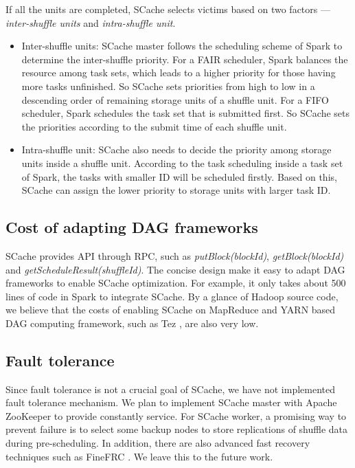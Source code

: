 If all the units are completed, SCache selects victims based on two factors --- \textit{inter-shuffle units} and \textit{intra-shuffle unit}.
\begin{itemize}[noitemsep]
	\item Inter-shuffle units: SCache master follows the scheduling scheme of Spark to determine the inter-shuffle priority. For a FAIR scheduler, Spark balances the resource among task sets, which leads to a higher priority for those having more tasks unfinished. So SCache sets priorities from high to low in a descending order of remaining storage units of a shuffle unit. For a FIFO scheduler, Spark schedules the task set that is submitted first. So SCache sets the priorities according to the submit time of each shuffle unit.
	\item Intra-shuffle unit: SCache also needs to decide the priority among storage units inside a shuffle unit. According to the task scheduling inside a task set of Spark, the tasks with smaller ID will be scheduled firstly. Based on this, SCache can assign the lower priority to storage units with larger task ID.
\end{itemize}

\subsection{Cost of adapting DAG frameworks}
SCache provides API through RPC, such as \textit{putBlock(blockId)}, \textit{getBlock(blockId)} and \textit{getScheduleResult(shuffleId)}. The concise design make it easy to adapt DAG frameworks to enable SCache optimization. For example, it only takes about 500 lines of code in Spark to integrate SCache. By a glance of Hadoop source code, we believe that the costs of enabling SCache on MapReduce \cite{hadoop} and YARN \cite{yarn} based DAG computing framework, such as Tez \cite{tez}, are also very low.

\subsection{Fault tolerance}
Since fault tolerance is not a crucial goal of SCache, we have not implemented fault tolerance mechanism. We plan to implement SCache master with Apache ZooKeeper \cite{zookeeper} to provide constantly service.  For SCache worker, a promising way to prevent failure is to select some backup nodes to store replications of shuffle data during pre-scheduling. In addition, there are also advanced fast recovery techniques such as FineFRC \cite{finefrc}. We leave this to the future work.





